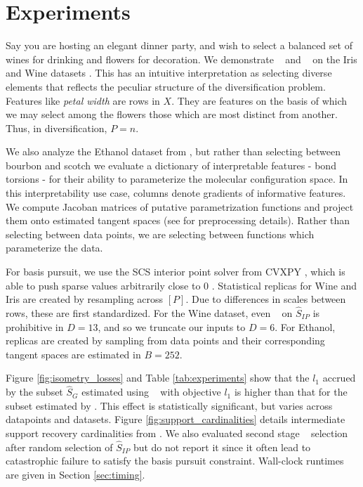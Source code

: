 \section{Experiments}
\label{sec:experiments}

Say you are hosting an elegant dinner party, and wish to select a balanced set of wines for drinking and flowers for decoration.
We demonstrate \tsip~ and \greedy~ on the Iris and Wine datasets \citep{misc_iris_53, misc_wine_109, scikit-learn}.
This has an intuitive interpretation as selecting diverse elements that reflects the peculiar structure of the diversification problem.
Features like \textit{ petal width} are rows in $X$.
They are features on the basis of which we may select among the flowers those which are most distinct from another.
Thus, in diversification, $P = n$.

We also analyze the Ethanol dataset from \citet{Chmiela2018-at, Koelle2022-ju}, but rather than selecting between bourbon and scotch we evaluate a dictionary of interpretable features  - bond torsions - for their ability to parameterize the molecular configuration space.
In this interpretability use case, columns denote gradients of informative features.
We compute Jacoban matrices of putative parametrization functions and project them onto estimated tangent spaces (see \citet{Koelle2022-ju} for preprocessing details).
Rather than selecting between data points, we are selecting between functions which parameterize the data.

For basis pursuit, we use the SCS interior point solver \citep{ocpb:16} from CVXPY \citep{diamond2016cvxpy, agrawal2018rewriting}, which is able to push sparse values arbitrarily close to 0 \citep{cvxpy_sparse_solution}.
Statistical replicas for Wine and Iris are created by resampling across $[P]$.
Due to differences in scales between rows, these are first standardized.
For the Wine dataset, even \brute~ on $\widehat {S}_{IP}$ is prohibitive in $D=13$, and so we truncate our inputs to $D=6$.
For Ethanol, replicas are created by sampling from data points and their corresponding tangent spaces are estimated in $B = 252$.

Figure \ref{fig:isometry_losses} and Table \ref{tab:experiments} show that the $l_1$ accrued by the subset $\widehat S_{G}$ estimated using \greedy~ with objective $l_1$ is higher than that for the subset estimated by \tsip.
This effect is statistically significant, but varies across datapoints and datasets.
Figure \ref{fig:support_cardinalities} details intermediate support recovery cardinalities from \isometrypursuit.
We also evaluated second stage \brute~ selection after random selection of $\widehat S_{IP}$ but do not report it since it often lead to catastrophic failure to satisfy the basis pursuit constraint.
Wall-clock runtimes are given in Section \ref{sec:timing}.


